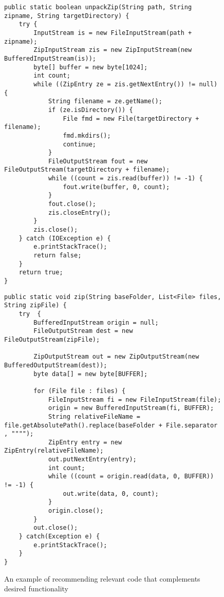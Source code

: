 \begin{figure*}[!t]
\begin{minipage}[t]{0.5\linewidth}
\begin{lstlisting}[style=MyJavaSmallStyle, caption={Query code: unpacking a zip file}, label={lst:mot-query}]
public static boolean unpackZip(String path, String zipname, String targetDirectory) {
	try {
		InputStream is = new FileInputStream(path + zipname);
		ZipInputStream zis = new ZipInputStream(new BufferedInputStream(is));
		byte[] buffer = new byte[1024];
		int count;
		while ((ZipEntry ze = zis.getNextEntry()) != null) {
			String filename = ze.getName();
			if (ze.isDirectory()) {
				File fmd = new File(targetDirectory + filename);
				fmd.mkdirs();
				continue;
			}
			FileOutputStream fout = new FileOutputStream(targetDirectory + filename);
			while ((count = zis.read(buffer)) != -1) {
				fout.write(buffer, 0, count);
			}
			fout.close();
			zis.closeEntry();
		}
		zis.close();
	} catch (IOException e) {
		e.printStackTrace();
		return false;
	}
	return true;
}
\end{lstlisting}
\end{minipage}
%
\begin{minipage}[t]{0.5\linewidth}
\begin{lstlisting}[style=MyJavaSmallStyle, caption={Related code: zipping a file}, label={lst:mot-related}]
public static void zip(String baseFolder, List<File> files, String zipFile) {
	try  {
		BufferedInputStream origin = null;
		FileOutputStream dest = new FileOutputStream(zipFile);

		ZipOutputStream out = new ZipOutputStream(new BufferedOutputStream(dest));
		byte data[] = new byte[BUFFER];

		for (File file : files) {
			FileInputStream fi = new FileInputStream(file);
			origin = new BufferedInputStream(fi, BUFFER);
			String relativeFileName = file.getAbsolutePath().replace(baseFolder + File.separator , """");
			ZipEntry entry = new ZipEntry(relativeFileName);
			out.putNextEntry(entry);
			int count;
			while ((count = origin.read(data, 0, BUFFER)) != -1) {
				out.write(data, 0, count);
			}
			origin.close();
		}
		out.close();
	} catch(Exception e) {
		e.printStackTrace();
	}
}
\end{lstlisting}
\end{minipage}
\caption{An example of recommending relevant code that complements desired functionality}
\label{fig:example}
\end{figure*}